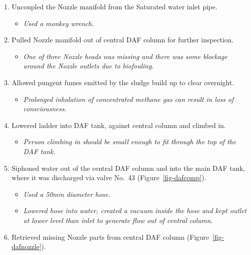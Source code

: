 \documentclass[
  12pt,
]{report}
\providecommand{\tightlist}{%
  \setlength{\itemsep}{0pt}\setlength{\parskip}{0pt}}\usepackage{longtable,booktabs,array}
\begin{document}
\begin{enumerate}
\def\labelenumi{\arabic{enumi}.}
\setcounter{enumi}{8}
\tightlist
\item
  Uncoupled the Nozzle manifold from the Saturated water inlet pipe.

  \begin{itemize}
  \tightlist
  \item
    \emph{Used a monkey wrench}.
  \end{itemize}
\item
  Pulled Nozzle manifold out of central DAF column for further
  inspection.

  \begin{itemize}
  \tightlist
  \item
    \emph{One of three Nozzle heads was missing and there was some
    blockage around the Nozzle outlets due to biofouling}.
  \end{itemize}
\item
  Allowed pungent fumes emitted by the sludge build up to clear
  overnight.

  \begin{itemize}
  \tightlist
  \item
    \emph{Prolonged inhalation of concentrated methane gas can result in
    loss of consciousness}.
  \end{itemize}
\item
  Lowered ladder into DAF tank, against central column and climbed in.

  \begin{itemize}
  \tightlist
  \item
    \emph{Person climbing in should be small enough to fit through the
    top of the DAF tank}.
  \end{itemize}
\item
  Siphoned water out of the central DAF column and into the main DAF
  tank, where it was discharged via valve No.~43
  (Figure~\ref{fig-dafcomp}).

  \begin{itemize}
  \tightlist
  \item
    \emph{Used a 50mm diameter hose}.
  \item
    \emph{Lowered hose into water, created a vacuum inside the hose and
    kept outlet at lower level than inlet to generate flow out of
    central column}.
  \end{itemize}
\item
  Retrieved missing Nozzle parts from central DAF column
  (Figure~\ref{fig-dafnozzle}).


\end{enumerate}
\end{document}
